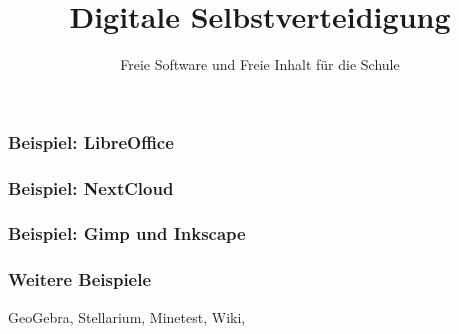 \documentclass{beamer}
\begin{document}
\title{Digitale Selbstverteidigung}
\subtitle{Freie Software und Freie Inhalt für die Schule}

\maketitle

\begin{frame}
  \frametitle{Beispiel: LibreOffice}


\end{frame}

\begin{frame}
  \frametitle{Beispiel: NextCloud}


\end{frame}

\begin{frame}
  \frametitle{Beispiel: Gimp und Inkscape}

\end{frame}

\begin{frame}
  \frametitle{Weitere Beispiele}

  GeoGebra, Stellarium, Minetest, Wiki,

\end{frame}
\end{document}
